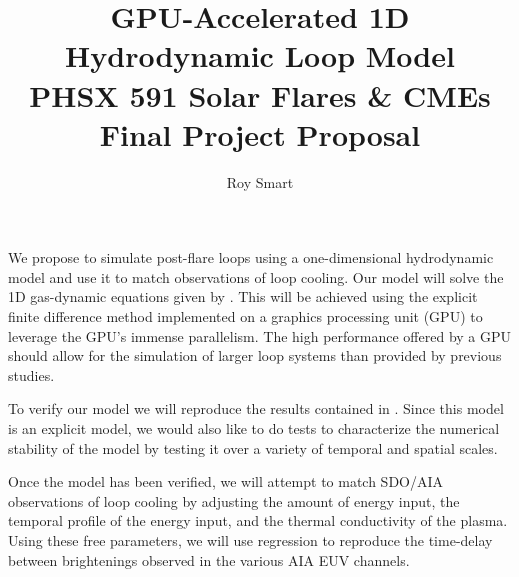 \documentclass[10pt,letterpaper]{article}
\author{Roy Smart}
\title{GPU-Accelerated 1D Hydrodynamic Loop Model \\ PHSX 591 Solar Flares \& CMEs \\ Final Project Proposal}
\begin{document}
	
	\maketitle
	
	We propose to simulate post-flare loops using a one-dimensional hydrodynamic model and use it to match observations of loop cooling. Our model will solve the 1D gas-dynamic equations given by \cite{2014ApJ...795...10L}. This will be achieved using the explicit finite difference method implemented on a graphics processing unit (GPU) to leverage the GPU's immense parallelism. The high performance offered by a GPU should allow for the simulation of larger loop systems than provided by previous studies.
	
	To verify our model we will reproduce the results contained in \cite{2014ApJ...795...10L}. Since this model is an explicit model, we would also like to do tests to characterize the numerical stability of the model by testing it over a variety of temporal and spatial scales.
	
	Once the model has been verified, we will attempt to match SDO/AIA observations of loop cooling by adjusting the amount of energy input, the temporal profile of the energy input, and the thermal conductivity of the plasma. Using these free parameters, we will use regression to reproduce the time-delay between brightenings observed in the various AIA EUV channels.
	
	
	\printbibliography
	
\end{document}

